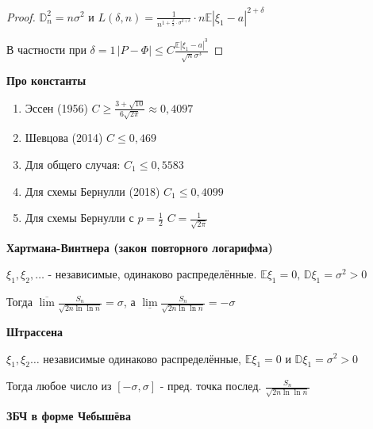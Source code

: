 \begin{proof}
    $\mathbb{D}_n^2 = n \sigma^2$ и $L (\delta, n) = \frac{1}{n^{1 + \frac{\delta}{2} \cdot \sigma^{2 + \delta}}} \cdot n \mathbb{E} |\xi_1 - a|^{2 + \delta}$

    В частности при $\delta = 1 \, |P - \Phi| \leqslant C \frac{\mathbb{E} |\xi_1 - a|^3}{\sqrt{n} \sigma^3}$
\end{proof}

\begin{remark}
    \textbf{Про константы}

    \begin{enumerate}
        \item {
            Эссен (1956) $C \geqslant \frac{3 + \sqrt{10}}{6 \sqrt{2 \pi}} \approx 0,4097$
        }
        \item {
            Шевцова (2014) $C \leqslant 0,469$
        }
        \item {
            Для общего случая: $C_1 \leqslant 0,5583$
        }
        \item {
            Для схемы Бернулли (2018) $C_1 \leqslant 0,4099$
        }
        \item {
            Для схемы Бернулли с $p = \frac{1}{2}$ $C = \frac{1}{\sqrt{2\pi}}$
        }
    \end{enumerate}
\end{remark}

\begin{theorem}
    \textbf{Хартмана-Винтнера (закон повторного логарифма)}

    $\xi_1, \xi_2, \ldots$ - независимые, одинаково распределённые. $\mathbb{E} \xi_1 = 0, \, \mathbb{D} \xi_1 = \sigma^2 > 0$

    Тогда $\overline{\lim} \frac{S_n}{\sqrt{2n \ln \ln n}} = \sigma$, а $\underline{\lim} \frac{S_n}{\sqrt{2n \ln \ln n}} = -\sigma$
\end{theorem}

\begin{theorem}
    \textbf{Штрассена}

    $\xi_1, \xi_2 \ldots$ независимые одинаково распределённые, $\mathbb{E} \xi_1 = 0$ и $\mathbb{D} \xi_1 = \sigma^2 > 0$

    Тогда любое число из $[-\sigma, \sigma]$ - пред. точка послед. $\frac{S_n}{\sqrt{2n \ln \ln n}}$
\end{theorem}



 \textbf{ЗБЧ в форме Чебышёва}

